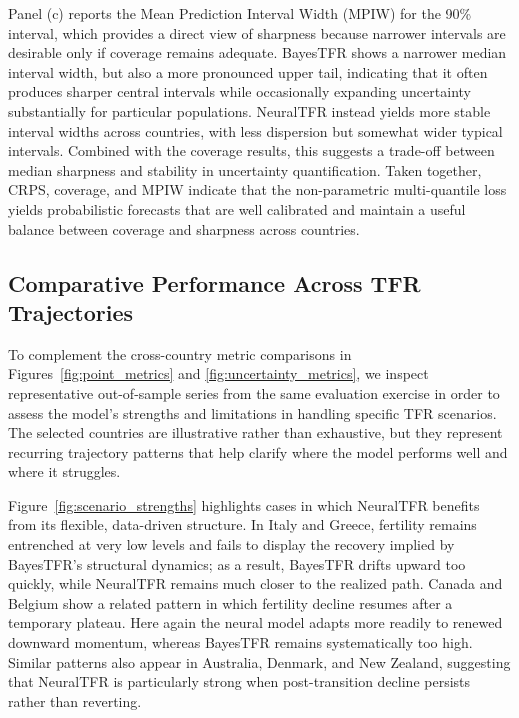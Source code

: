 \documentclass[12pt]{article}
\begin{document}
Panel (c) reports the Mean Prediction Interval Width (MPIW) for the 90\% interval, which provides a direct view of sharpness because narrower intervals are desirable only if coverage remains adequate. BayesTFR shows a narrower median interval width, but also a more pronounced upper tail, indicating that it often produces sharper central intervals while occasionally expanding uncertainty substantially for particular populations. NeuralTFR instead yields more stable interval widths across countries, with less dispersion but somewhat wider typical intervals. Combined with the coverage results, this suggests a trade-off between median sharpness and stability in uncertainty quantification. Taken together, CRPS, coverage, and MPIW indicate that the non-parametric multi-quantile loss yields probabilistic forecasts that are well calibrated and maintain a useful balance between coverage and sharpness across countries.

\subsection{Comparative Performance Across TFR Trajectories}

To complement the cross-country metric comparisons in Figures~\ref{fig:point_metrics} and \ref{fig:uncertainty_metrics}, we inspect representative out-of-sample series from the same evaluation exercise in order to assess the model's strengths and limitations in handling specific TFR scenarios. The selected countries are illustrative rather than exhaustive, but they represent recurring trajectory patterns that help clarify where the model performs well and where it struggles.

Figure~\ref{fig:scenario_strengths} highlights cases in which NeuralTFR benefits from its flexible, data-driven structure. In Italy and Greece, fertility remains entrenched at very low levels and fails to display the recovery implied by BayesTFR's structural dynamics; as a result, BayesTFR drifts upward too quickly, while NeuralTFR remains much closer to the realized path. Canada and Belgium show a related pattern in which fertility decline resumes after a temporary plateau. Here again the neural model adapts more readily to renewed downward momentum, whereas BayesTFR remains systematically too high. Similar patterns also appear in Australia, Denmark, and New Zealand, suggesting that NeuralTFR is particularly strong when post-transition decline persists rather than reverting.
\end{document}

